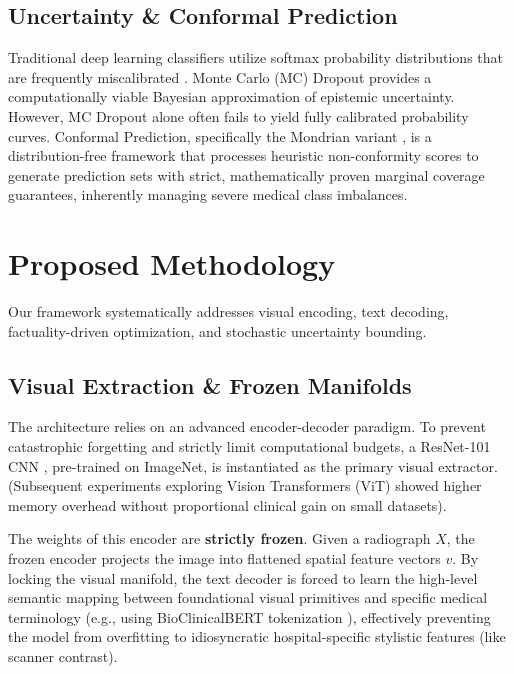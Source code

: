 \documentclass[10pt,a4paper,twocolumn]{article}
\begin{document}
\subsection{Uncertainty \& Conformal Prediction}
Traditional deep learning classifiers utilize softmax probability distributions that are frequently miscalibrated \cite{kendall2017uncertainties}. Monte Carlo (MC) Dropout \cite{gal2016dropout} provides a computationally viable Bayesian approximation of epistemic uncertainty. However, MC Dropout alone often fails to yield fully calibrated probability curves. Conformal Prediction, specifically the Mondrian variant \cite{vovk2005algorithmic, angelopoulos2020gentle}, is a distribution-free framework that processes heuristic non-conformity scores to generate prediction sets with strict, mathematically proven marginal coverage guarantees, inherently managing severe medical class imbalances.

\section{Proposed Methodology}
\label{sec:methodology}

Our framework systematically addresses visual encoding, text decoding, factuality-driven optimization, and stochastic uncertainty bounding. 

\subsection{Visual Extraction \& Frozen Manifolds}
The architecture relies on an advanced encoder-decoder paradigm. To prevent catastrophic forgetting and strictly limit computational budgets, a ResNet-101 CNN \cite{he2016deep}, pre-trained on ImageNet, is instantiated as the primary visual extractor. (Subsequent experiments exploring Vision Transformers (ViT) \cite{dosovitskiy2020image} showed higher memory overhead without proportional clinical gain on small datasets). 

The weights of this encoder are \textbf{strictly frozen}. Given a radiograph $X$, the frozen encoder projects the image into flattened spatial feature vectors $v$. By locking the visual manifold, the text decoder is forced to learn the high-level semantic mapping between foundational visual primitives and specific medical terminology (e.g., using BioClinicalBERT tokenization \cite{devlin2018bert}), effectively preventing the model from overfitting to idiosyncratic hospital-specific stylistic features (like scanner contrast).
\end{document}

